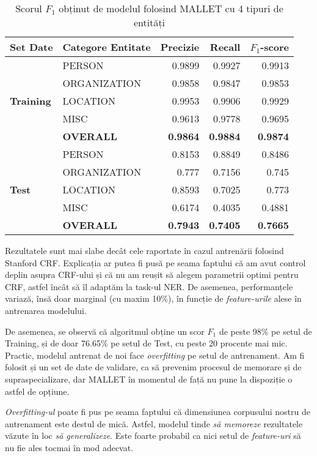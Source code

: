 \begin{center}
\begin{table}[htb]
  \caption{Scorul $F_1$ obținut de modelul folosind MALLET cu 4 tipuri de entități}
  \begin{tabular}{|l|l|r|r|r|}
  \hline  
  Set Date & Categore Entitate & Precizie & Recall & $F_1$-score \\
  \hline  
  \multirow{5}{*}{\textbf{Training}} & PERSON & 0.9899 & 0.9927 & 0.9913 \\
  & ORGANIZATION & 0.9858 & 0.9847 & 0.9853 \\
  & LOCATION & 0.9953 & 0.9906 & 0.9929 \\
  & MISC & 0.9613 & 0.9778  & 0.9695 \\
   \hline 
  & \textbf{OVERALL} &\textbf{0.9864} & \textbf{0.9884} & \textbf{0.9874 }\\
  \hline  
  
  \multirow{5}{*}{\textbf{Test}} & PERSON & 0.8153 & 0.8849 & 0.8486 \\
    & ORGANIZATION & 0.777 & 0.7156 & 0.745 \\
    & LOCATION & 0.8593 & 0.7025 & 0.773 \\
    & MISC & 0.6174 & 0.4035  & 0.4881 \\
     \hline 
    & \textbf{OVERALL} & \textbf{0.7943} & \textbf{0.7405} & \textbf{0.7665} \\
    \hline  
  \end{tabular}
  \label{table:f1-score-mallet}
\end{table}
\end{center}

Rezultatele sunt mai slabe decât cele raportate în cazul antrenării folosind Stanford CRF. Explicația ar putea fi pusă pe seama faptului că am avut control deplin asupra CRF-ului și că nu am reușit să alegem parametrii optimi pentru CRF, astfel încât să îl adaptăm la task-ul NER. De asemenea, performanțele variază, însă doar marginal (cu maxim 10\%), în funcție de \textit{feature-urile} alese în antrenarea modelului.

De asemenea, se observă că algoritmul obține un scor $F_1$ de peste 98\% pe setul de Training, și de doar 76.65\% pe setul de Test, cu peste 20 procente mai mic. Practic, modelul antrenat de noi face \textit{overfitting} pe setul de antrenament. Am fi folosit și un set de date de validare, ca să prevenim procesul de memorare și de supraspecializare, dar MALLET în momentul de față nu pune la dispoziție o astfel de opțiune.

\textit{Overfitting-ul} poate fi pus pe seama faptului că dimensiunea corpusului nostru de antrenament este destul de mică. Astfel, modelul tinde \textit{să memoreze} rezultatele văzute în loc \textit{să generalizeze}. Este foarte probabil ca nici setul de \textit{feature-uri} să nu fie ales tocmai în mod adecvat.















